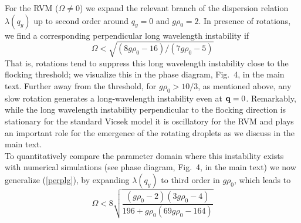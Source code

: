 \documentclass[aps,twocolumn,showlabels,showrefs,amsmath,amssymb,pre,superscriptaddress, floatfix, colors]{revtex4}
\newcommand{\1}{\begin{equation}}
\newcommand{\2}{\end{equation}}
\newcommand{\4}[2]{{\frac{#1}{#2}}}
\begin{document}
For the RVM ($\Omega \neq 0$) we expand the relevant branch of the dispersion relation $\lambda(q_y)$ up to second order around $q_y=0$ and $g\rho_0=2$.
In presence of rotations, we find a corresponding perpendicular long wavelength instability if 
\1 \Omega<\sqrt{(8g\rho_0-16)/(7g\rho_0-5)} \label{perplg}\2
That is, rotations tend to suppress this long wavelength instability close to the flocking threshold; we visualize this in the phase diagram, Fig.~4, 
in the main text. Further away from the threshold, for $g\rho_0>10/3$, as mentioned above, any slow rotation generates a long-wavelength instability even at ${\bf q}=0$.
Remarkably, while the long wavelength instability perpendicular to the flocking direction is stationary for the 
standard Vicsek model it is oscillatory for the RVM and plays an important role 
for the emergence of the rotating droplets as we discuss in the main text.
\\To quantitatively compare the parameter domain where this instability exists with numerical simulations (see phase diagram, Fig.~4, in the main text)
we now generalize (\ref{perplg}), by expanding $\lambda(q_y)$ to third order in $g\rho_0$, which leads to
\1 \Omega<8 \sqrt{\4{(g\rho_0-2)(3g\rho_0-4)}{196 +g\rho_0 (69g\rho_0 -164)}}\2
\end{document}
